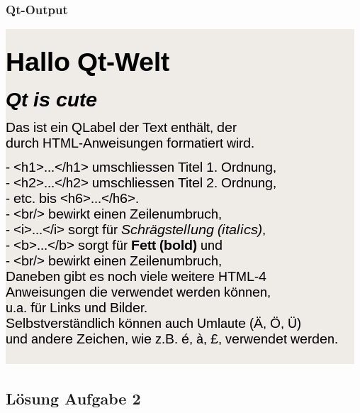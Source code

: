 \subsubsection{Qt-Output}
\begin{center}
	\includegraphics[scale=.5]{./images/u11a1.png}
\end{center}

\subsection{Lösung Aufgabe 2}

